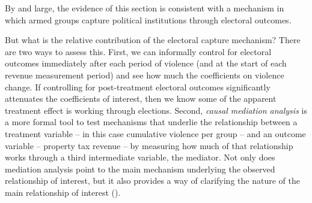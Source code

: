 \begin{table}[htbp]
\def\sym#1{\ifmmode^{#1}\else\(^{#1}\)\fi}\caption*{Table 3.4 (continued). Mechanisms: Direct capture, Cumulative violence and electoral outcomes}
\begin{center}
\end{center}
\end{table}

By and large, the evidence of this section is consistent with a mechanism in which armed groups capture political institutions through electoral outcomes. 

But what is the relative contribution of the electoral capture mechanism? There are two ways to assess this. First, we can informally control for electoral outcomes immediately after each period of violence (and at the start of each revenue measurement period) and see how much the coefficients on violence change. If controlling for post-treatment electoral outcomes significantly attenuates the coefficients of interest, then we know some of the apparent treatment effect is working through elections. Second, {\it causal mediation analysis} is a more formal tool to test mechanisms that underlie the relationship between a treatment variable -- in this case cumulative violence per group -- and an outcome variable -- property tax revenue -- by measuring how much of that relationship works through a third intermediate variable, the mediator. Not only does mediation analysis point to the main mechanism underlying the observed relationship of interest, but it also provides a way of clarifying the nature of the main relationship of interest (\citet{imaietal2011}).

